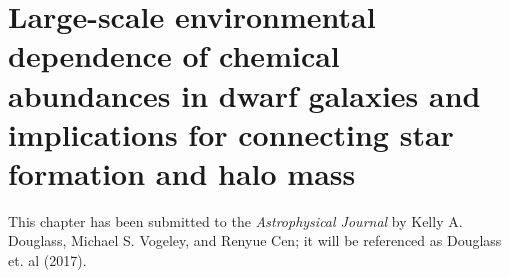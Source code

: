 \chapter{Large-scale environmental dependence of chemical abundances in dwarf galaxies and implications for connecting star formation and halo mass}\label{ch:Paper3}


This chapter has been submitted to the \emph{Astrophysical Journal} by Kelly A. 
Douglass, Michael S. Vogeley, and Renyue Cen; it will be referenced as Douglass 
et. al (2017).